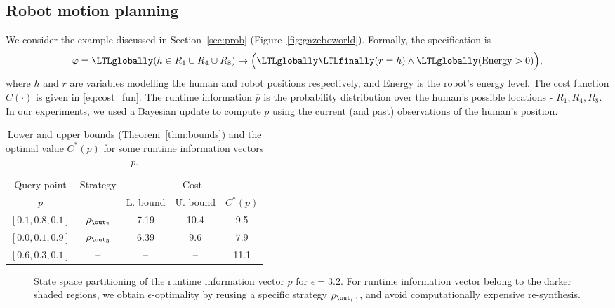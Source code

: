 \subsection{Robot motion planning}

We consider the example discussed in Section~\ref{sec:prob} (Figure~\ref{fig:gazeboworld}).
Formally, the specification is
\[
    \varphi = \LTLglobally (h \in R_1 \cup R_4 \cup R_8) \rightarrow \Big( \LTLglobally \LTLfinally (r = h) \wedge \LTLglobally (\mathrm{Energy} > 0) \Big),
\]
where $h$ and $r$ are variables modelling the human and robot positions respectively, and $\mathrm{Energy}$ is the robot's energy level.
The cost function $C(\cdot)$ is given in \eqref{eq:cost_fun}.
The runtime information $\overline{p}$ is the probability distribution over the human's possible locations - $R_1, R_4,R_8$. 
In our experiments, we used a Bayesian update to compute $\overline{p}$ using the current (and past) observations of the human's position. 

\begin{table}
    \centering
    \begin{tabular}{|c|c|c|c|c|}\toprule
        Query point  & \multirow{2}{*}{Strategy} & \multicolumn{3}{c|}{Cost}  \\\cmidrule{3-5}
        $\overline{p}$  & & L. bound & U. bound &  $C^\ast(\overline{p})$\\  \midrule
        $[0.1, 0.8, 0.1]$ & $\rho_{\out_2}$ & 7.19 & 10.4 & 9.5 \\ 
        $[0.0, 0.1, 0.9]$ & $\rho_{\out_3}$  & 6.39 & 9.6 & 7.9 \\ 
        \rowcolor{red!10} $[0.6, 0.3, 0.1]$ & -- & -- & -- & 11.1\\ \bottomrule
    \end{tabular}
    \caption{Lower and upper bounds (Theorem~\ref{thm:bounds}) and the optimal value $C^\ast(\overline{p})$ for some runtime information vectors $\overline{p}$.}
    \label{tab:perf}
\end{table}{}
\begin{figure}
    \centering
    
    \caption{State space partitioning of the runtime information vector $\overline{p}$ for $\epsilon = 3.2$. For runtime information vector belong to the darker shaded regions, we obtain $\epsilon$-optimality by reusing a specific strategy $\rho_{\out_{(\cdot)}}$, and avoid computationally expensive re-synthesis.}
    \label{fig:partition}
\end{figure}

